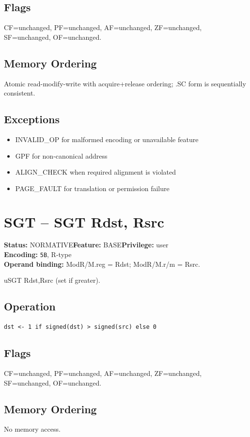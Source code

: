 \documentclass[10pt]{article}
\begin{document}
\subsection*{Flags}
CF=unchanged, PF=unchanged, AF=unchanged, ZF=unchanged, SF=unchanged, OF=unchanged.
\subsection*{Memory Ordering}
Atomic read-modify-write with acquire+release ordering; .SC form is sequentially consistent.
\subsection*{Exceptions}
\begin{itemize}
\item INVALID\_OP for malformed encoding or unavailable feature
\item GPF for non-canonical address
\item ALIGN\_CHECK when required alignment is violated
\item PAGE\_FAULT for translation or permission failure
\end{itemize}
\clearpage

\section{SGT -- SGT Rdst, Rsrc}
\textbf{Status:} NORMATIVE\quad \textbf{Feature:} BASE\quad \textbf{Privilege:} user\\
\textbf{Encoding:} \texttt{5B}, R-type\\
\textbf{Operand binding:} ModR/M.reg = Rdst; ModR/M.r/m = Rsrc.

uSGT Rdst,Rsrc (set if greater).

\subsection*{Operation}
\begin{lstlisting}
dst <- 1 if signed(dst) > signed(src) else 0
\end{lstlisting}
\subsection*{Flags}
CF=unchanged, PF=unchanged, AF=unchanged, ZF=unchanged, SF=unchanged, OF=unchanged.
\subsection*{Memory Ordering}
No memory access.
\end{document}
